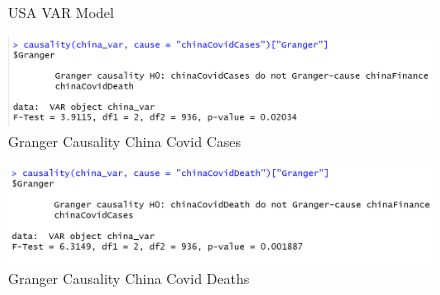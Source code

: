 \documentclass[11pt]{article}
\begin{document}
\begin{figure}[htb]
  \centering
  \hfill
  \hfill
  \caption{USA VAR Model}\label{fig:USAVAR}
\end{figure}



\begin{figure}[!h]
\centering
  \includegraphics[width=\textwidth]{R-Code/Causalities/China_Covid_Cases.png}  
  \caption{Granger Causality China Covid Cases}
  \label{fig:GrangerChina}
  \end{figure}
\begin{figure}[!h]
\centering
  \includegraphics[width=\textwidth]{R-Code/Causalities/China_Covid_Deaths.png}  
  \caption{Granger Causality China Covid Deaths}
  \end{figure}
 
\end{document}
